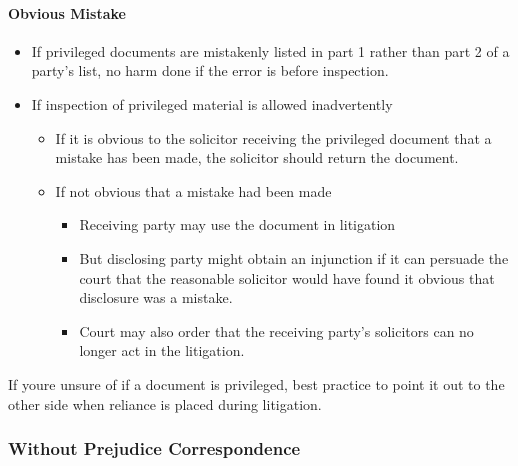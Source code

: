\documentclass[
]{article}
\newenvironment{Shaded}{}{}
\newcommand{\NormalTok}[1]{#1}
\providecommand{\tightlist}{%
  \setlength{\itemsep}{0pt}\setlength{\parskip}{0pt}}
\begin{document}
\hypertarget{obvious-mistake}{%
\paragraph{Obvious Mistake}\label{obvious-mistake}}

\begin{itemize}
\tightlist
\item
  If privileged documents are mistakenly listed in part 1 rather than
  part 2 of a party's list, no harm done if the error is before
  inspection.
\item
  If inspection of privileged material is allowed inadvertently

  \begin{itemize}
  \tightlist
  \item
    If it is obvious to the solicitor receiving the privileged document
    that a mistake has been made, the solicitor should return the
    document.
  \item
    If not obvious that a mistake had been made

    \begin{itemize}
    \tightlist
    \item
      Receiving party may use the document in litigation
    \item
      But disclosing party might obtain an injunction if it can persuade
      the court that the reasonable solicitor would have found it
      obvious that disclosure was a mistake.
    \item
      Court may also order that the receiving party's solicitors can no
      longer act in the litigation.
    \end{itemize}
  \end{itemize}
\end{itemize}

\begin{Shaded}
\begin{Highlighting}[]
\NormalTok{If you\textquotesingle{}re unsure of if a document is privileged, best practice to point it out to the other side when reliance is placed during litigation.}
\end{Highlighting}
\end{Shaded}

\hypertarget{without-prejudice-correspondence}{%
\subsubsection{Without Prejudice
Correspondence}\label{without-prejudice-correspondence}}
\end{document}
